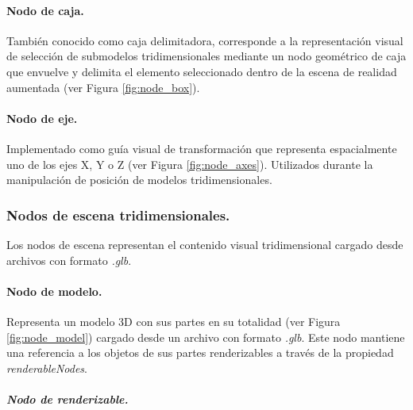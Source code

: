                     

            \paragraph{Nodo de caja.}
            
                También conocido como caja delimitadora, corresponde a la representación visual de selección de submodelos tridimensionales mediante un nodo geométrico de caja que envuelve y delimita el elemento seleccionado dentro de la escena de realidad aumentada (ver Figura \ref{fig:node_box}).

                

            \paragraph{Nodo de eje.}
            
                Implementado como guía visual de transformación que representa espacialmente uno de los ejes X, Y o Z (ver Figura \ref{fig:node_axes}). Utilizados durante la manipulación de posición de modelos tridimensionales.

                

        \subsubsection{Nodos de escena tridimensionales.}

            Los nodos de escena representan el contenido visual tridimensional cargado desde archivos con formato \textit{.glb}.

            \paragraph{Nodo de modelo.}

                Representa un modelo 3D con sus partes en su totalidad (ver Figura \ref{fig:node_model}) cargado desde un archivo con formato \textit{.glb}. Este nodo mantiene una referencia a los objetos de sus partes renderizables a través de la propiedad \textit{renderableNodes}.

                

                \subparagraph{Nodo de renderizable.}

